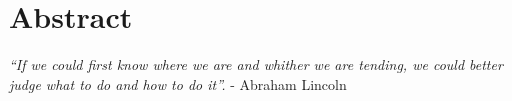 \section*{Abstract}

\textit{“If we could first know where we are and whither we are tending, we could better judge what to do and how to do it”.}
- Abraham Lincoln